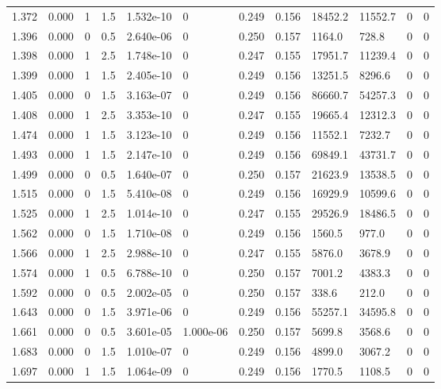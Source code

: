 \documentclass[preview]{standalone}
\begin{document}
{{{\begin{tabular}{L{1.2cm}C{1.2cm} C{0.3cm}C{0.5cm} C{1.4cm}C{1.4cm} C{1.4cm}C{1.4cm} C{1.6cm}C{1.6cm} C{1.6cm}C{1.6cm}}
  1.372  &  0.000  & 1     & 1.5 &  1.532e-10  & 0  &  0.249&   0.156& 18452.2 & 11552.7   &  0 & 0  \\ 
  1.396  &  0.000  & 0     & 0.5 &  2.640e-06  & 0  &  0.250&   0.157& 1164.0 & 728.8   &  0 & 0  \\ 
  1.398  &  0.000  & 1     & 2.5 &  1.748e-10  & 0  &  0.247&   0.155& 17951.7 & 11239.4   &  0 & 0  \\ 
  1.399  &  0.000  & 1     & 1.5 &  2.405e-10  & 0  &  0.249&   0.156& 13251.5 & 8296.6   &  0 & 0  \\ 
  1.405  &  0.000  & 0     & 1.5 &  3.163e-07  & 0  &  0.249&   0.156& 86660.7 & 54257.3   &  0 & 0  \\ 
  1.408  &  0.000  & 1     & 2.5 &  3.353e-10  & 0  &  0.247&   0.155& 19665.4 & 12312.3   &  0 & 0  \\ 
  1.474  &  0.000  & 1     & 1.5 &  3.123e-10  & 0  &  0.249&   0.156& 11552.1 & 7232.7   &  0 & 0  \\ 
  1.493  &  0.000  & 1     & 1.5 &  2.147e-10  & 0  &  0.249&   0.156& 69849.1 & 43731.7   &  0 & 0  \\ 
  1.499  &  0.000  & 0     & 0.5 &  1.640e-07  & 0  &  0.250&   0.157& 21623.9 & 13538.5   &  0 & 0  \\ 
  1.515  &  0.000  & 0     & 1.5 &  5.410e-08  & 0  &  0.249&   0.156& 16929.9 & 10599.6   &  0 & 0  \\ 
  1.525  &  0.000  & 1     & 2.5 &  1.014e-10  & 0  &  0.247&   0.155& 29526.9 & 18486.5   &  0 & 0  \\ 
  1.562  &  0.000  & 0     & 1.5 &  1.710e-08  & 0  &  0.249&   0.156& 1560.5 & 977.0   &  0 & 0  \\ 
  1.566  &  0.000  & 1     & 2.5 &  2.988e-10  & 0  &  0.247&   0.155& 5876.0 & 3678.9   &  0 & 0  \\ 
  1.574  &  0.000  & 1     & 0.5 &  6.788e-10  & 0  &  0.250&   0.157& 7001.2 & 4383.3   &  0 & 0  \\ 
  1.592  &  0.000  & 0     & 0.5 &  2.002e-05  & 0  &  0.250&   0.157& 338.6 & 212.0   &  0 & 0  \\ 
  1.643  &  0.000  & 0     & 1.5 &  3.971e-06  & 0  &  0.249&   0.156& 55257.1 & 34595.8   &  0 & 0  \\ 
  1.661  &  0.000  & 0     & 0.5 &  3.601e-05  & 1.000e-06  &  0.250&   0.157& 5699.8 & 3568.6   &  0 & 0  \\ 
  1.683  &  0.000  & 0     & 1.5 &  1.010e-07  & 0  &  0.249&   0.156& 4899.0 & 3067.2   &  0 & 0  \\ 
  1.697  &  0.000  & 1     & 1.5 &  1.064e-09  & 0  &  0.249&   0.156& 1770.5 & 1108.5   &  0 & 0  \\ 

\end{tabular}}}}
\end{document}
